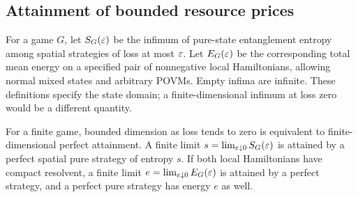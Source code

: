 \subsection{Attainment of bounded resource prices}
For a game $G$, let $S_G(\varepsilon)$ be the infimum of pure-state entanglement entropy among spatial strategies of loss at most $\varepsilon$. Let $E_G(\varepsilon)$ be the corresponding total mean energy on a specified pair of nonnegative local Hamiltonians, allowing normal mixed states and arbitrary POVMs. Empty infima are infinite. These definitions specify the state domain; a finite-dimensional infimum at loss zero would be a different quantity.

\begin{theorem}\label{thm:attainment}
For a finite game, bounded dimension as loss tends to zero is equivalent to finite-dimensional perfect attainment. A finite limit $s=\lim_{\varepsilon\downarrow0}S_G(\varepsilon)$ is attained by a perfect spatial pure strategy of entropy $s$. If both local Hamiltonians have compact resolvent, a finite limit $e=\lim_{\varepsilon\downarrow0}E_G(\varepsilon)$ is attained by a perfect strategy, and a perfect pure strategy has energy $e$ as well.
\end{theorem}
